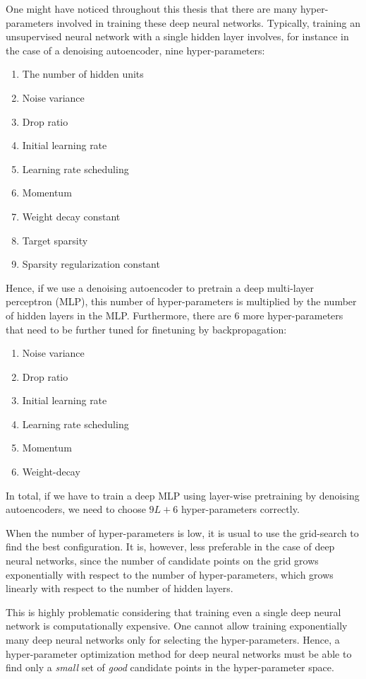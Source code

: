 \documentclass[dissertation,nocontribution,draft*]{aaltoseries}
\begin{document}
One might have noticed throughout this thesis that there are
many hyper-parameters involved in training these deep
neural networks. Typically, training an unsupervised neural
network with a single hidden layer involves, for instance
in the case of a denoising autoencoder, nine
hyper-parameters:
\begin{enumerate}
    \itemsep 0em
    \item The number of hidden units
    \item Noise variance
    \item Drop ratio
    \item Initial learning rate
    \item Learning rate scheduling
    \item Momentum
    \item Weight decay constant
    \item Target sparsity
    \item Sparsity regularization constant
\end{enumerate}
Hence, if we use a denoising autoencoder to pretrain a deep
multi-layer perceptron (MLP), this number of 
hyper-parameters is multiplied by the number of hidden layers
in the MLP. Furthermore, there are 6 more hyper-parameters
that need to be further tuned for finetuning by
backpropagation:
\begin{enumerate}
    \itemsep 0em
    \item Noise variance
    \item Drop ratio
    \item Initial learning rate
    \item Learning rate scheduling
    \item Momentum
    \item Weight-decay
\end{enumerate}
In total, if we have to train a deep MLP using layer-wise
pretraining by denoising autoencoders, we need to choose $9L
+ 6$ hyper-parameters correctly. 

When the number of hyper-parameters is low, it is usual to
use the grid-search to find the best configuration. It is, however,
less preferable in the case of deep neural networks, since
the number of candidate points on the grid grows
exponentially with respect to the number of
hyper-parameters,
which grows linearly with respect to the number of hidden
layers. 

This is highly problematic considering that training even a
single deep neural network is computationally expensive. One
cannot allow training exponentially many deep neural
networks only for selecting the hyper-parameters.
Hence, a hyper-parameter optimization method for deep neural
networks must be able to find only a \textit{small} set of
\textit{good} candidate points in the hyper-parameter space.
\end{document}
